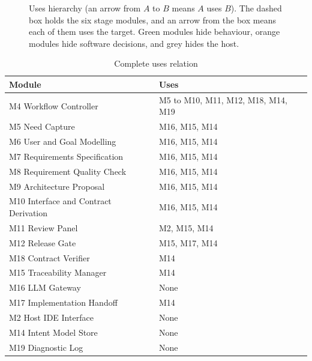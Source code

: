 \documentclass[12pt, titlepage]{article}
\begin{document}
\begin{figure}[H]
{}
\caption{Uses hierarchy (an arrow from $A$ to $B$ means $A$ uses $B$). The
dashed box holds the six stage modules, and an arrow from the box means each
of them uses the target. Green modules hide behaviour, orange modules hide
software decisions, and grey hides the host.}
\label{FigUH}
\end{figure}

\begin{table}[H]
\centering
\begin{tabular}{p{} p{}}
\toprule
\textbf{Module} & \textbf{Uses}\\
\midrule
M4 Workflow Controller & M5 to M10, M11, M12, M18, M14, M19\\
M5 Need Capture & M16, M15, M14\\
M6 User and Goal Modelling & M16, M15, M14\\
M7 Requirements Specification & M16, M15, M14\\
M8 Requirement Quality Check & M16, M15, M14\\
M9 Architecture Proposal & M16, M15, M14\\
M10 Interface and Contract Derivation & M16, M15, M14\\
M11 Review Panel & M2, M15, M14\\
M12 Release Gate & M15, M17, M14\\
M18 Contract Verifier & M14\\
M15 Traceability Manager & M14\\
M16 LLM Gateway & None\\
M17 Implementation Handoff & M14\\
M2 Host IDE Interface & None\\
M14 Intent Model Store & None\\
M19 Diagnostic Log & None\\
\bottomrule
\end{tabular}
\caption{Complete uses relation}
\label{TblUses}
\end{table}
\end{document}
